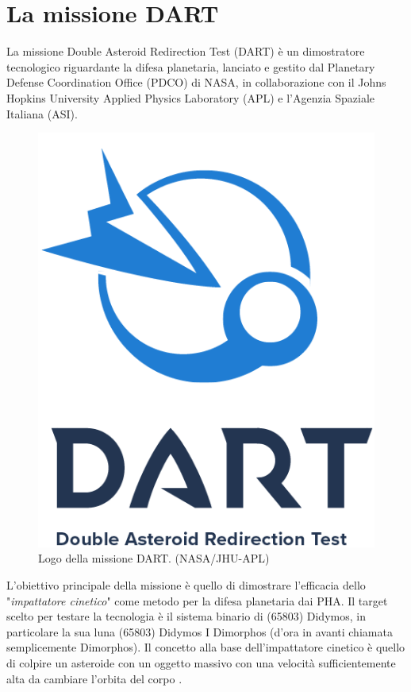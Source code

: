 \documentclass[a4paper,11pt,openright]{book}
\begin{document}
\chapter{La missione DART}\label{ch:ch_3}

La missione Double Asteroid Redirection Test (DART) è un dimostratore tecnologico riguardante la difesa planetaria, lanciato e gestito dal Planetary Defense Coordination Office (PDCO) di NASA, in collaborazione con il Johns Hopkins University Applied Physics Laboratory (APL) e l'Agenzia Spaziale Italiana (ASI).

\begin{figure}[!h]
    \centering
    \includegraphics[scale=0.5]{figure/DART_mission_patch.png}
    \caption[Logo della missione DART.]{Logo della missione DART. (NASA/JHU-APL)}
    \label{fig:logo_DART}
\end{figure}

L'obiettivo principale della missione è quello di dimostrare l'efficacia dello "\textit{impattatore cinetico}" come metodo per la difesa planetaria dai PHA. Il target scelto per testare la tecnologia è il sistema binario di (65803) Didymos, in particolare la sua luna (65803) Didymos I Dimorphos (d'ora in avanti chiamata semplicemente Dimorphos). Il concetto alla base dell'impattatore cinetico è quello di colpire un asteroide con un oggetto massivo con una velocità sufficientemente alta da cambiare l'orbita del corpo \citep{rivkin_double_2021}.
\end{document}
